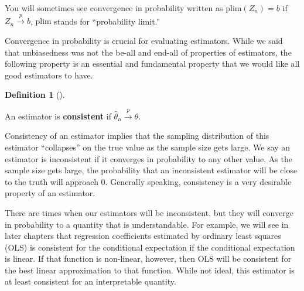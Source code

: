 \documentclass[
  letterpaper,
  DIV=11,
  numbers=noendperiod]{scrreprt}
\newcommand{\inprob}{\overset{p}{\to}}
\theoremstyle{definition}
\newtheorem{definition}{Definition}[chapter]
\theoremstyle{plain}
\theoremstyle{definition}
\theoremstyle{remark}
\begin{document}
\begin{tcolorbox}[enhanced jigsaw, opacitybacktitle=0.6, bottomrule=.15mm, colback=white, colframe=quarto-callout-note-color-frame, arc=.35mm, opacityback=0, breakable, leftrule=.75mm, titlerule=0mm, left=2mm, rightrule=.15mm, toptitle=1mm, bottomtitle=1mm, toprule=.15mm, title=\textcolor{quarto-callout-note-color}{\faInfo}\hspace{0.5em}{Notation alert}, colbacktitle=quarto-callout-note-color!10!white, coltitle=black]

You will sometimes see convergence in probability written as
\(\text{plim}(Z_n) = b\) if \(Z_n \inprob b\), \(\text{plim}\) stands
for ``probability limit.''

\end{tcolorbox}

Convergence in probability is crucial for evaluating estimators. While
we said that unbiasedness was not the be-all and end-all of properties
of estimators, the following property is an essential and fundamental
property that we would like all good estimators to have.

\begin{definition}[]\protect\hypertarget{def-consistency}{}\label{def-consistency}

An estimator is \textbf{consistent} if
\(\widehat{\theta}_n \inprob \theta\).

\end{definition}

Consistency of an estimator implies that the sampling distribution of
this estimator ``collapses'' on the true value as the sample size gets
large. We say an estimator is inconsistent if it converges in
probability to any other value. As the sample size gets large, the
probability that an inconsistent estimator will be close to the truth
will approach 0. Generally speaking, consistency is a very desirable
property of an estimator.

\begin{tcolorbox}[enhanced jigsaw, opacitybacktitle=0.6, bottomrule=.15mm, colback=white, colframe=quarto-callout-note-color-frame, arc=.35mm, opacityback=0, breakable, leftrule=.75mm, titlerule=0mm, left=2mm, rightrule=.15mm, toptitle=1mm, bottomtitle=1mm, toprule=.15mm, title=\textcolor{quarto-callout-note-color}{\faInfo}\hspace{0.5em}{Note}, colbacktitle=quarto-callout-note-color!10!white, coltitle=black]

There are times when our estimators will be inconsistent, but they will
converge in probability to a quantity that is understandable. For
example, we will see in later chapters that regression coefficients
estimated by ordinary least squares (OLS) is consistent for the
conditional expectation if the conditional expectation is linear. If
that function is non-linear, however, then OLS will be consistent for
the best linear approximation to that function. While not ideal, this
estimator is at least consistent for an interpretable quantity.

\end{tcolorbox}
\end{document}
